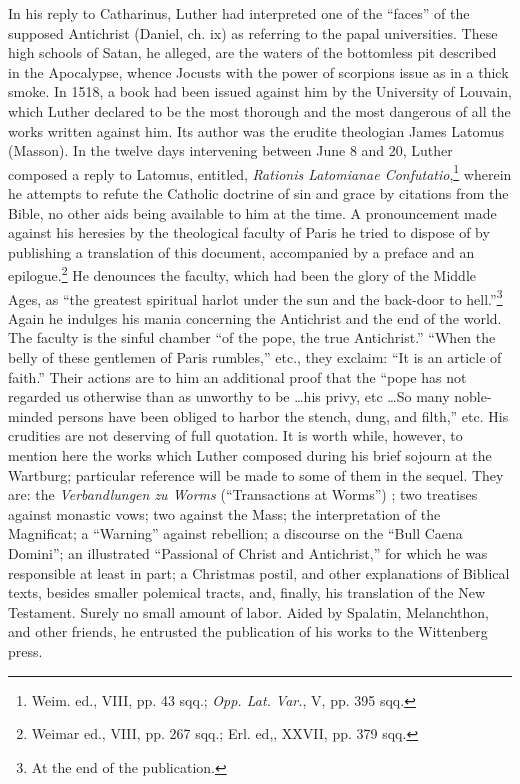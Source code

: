 In his reply to Catharinus, Luther had interpreted one of the
“faces” of the supposed Antichrist (Daniel, ch. ix) as referring to
the papal universities. These high schools of Satan, he alleged, are
the waters of the bottomless pit described in the Apocalypse, whence
Jocusts with the power of scorpions issue as in a thick smoke. In
1518, a book had been issued against him by the University of
Louvain, which Luther declared to be the most thorough and the most
dangerous of all the works written against him. Its author was the
erudite theologian James Latomus (Masson). In the twelve days
intervening between June 8 and 20, Luther composed a reply to
Latomus, entitled, \textit{Rationis Latomianae Confutatio},\footnote{Weim. ed., VIII, pp. 43 sqq.; \textit{Opp. Lat. Var.}, V, pp. 395 sqq.}
wherein he attempts to refute the Catholic doctrine of sin and grace by
citations from the Bible, no other aids being available to him at the time.
A pronouncement made against his heresies by the theological faculty
of Paris he tried to dispose of by publishing a translation of this
document, accompanied by a preface and an epilogue.\footnote{Weimar ed., VIII, pp. 267 sqq.; Erl. ed,, XXVII, pp. 379 sqq.}
He denounces
the faculty, which had been the glory of the Middle Ages, as “the
greatest spiritual harlot under the sun and the back-door to hell.”\footnote{At the end of the publication.}
Again he indulges his mania concerning the Antichrist and the end
of the world. The faculty is the sinful chamber “of the pope, the
true Antichrist.” “When the belly of these gentlemen of Paris
rumbles,” etc., they exclaim: “It is an article of faith.” Their actions
are to him an additional proof that the “pope has not regarded us
otherwise than as unworthy to be \dots his privy, etc \dots So many
noble-minded persons have been obliged to harbor the stench, dung,
and filth,” etc. His crudities are not deserving of full quotation.
It is worth while, however, to mention here the works which
Luther composed during his brief sojourn at the Wartburg; particular
reference will be made to some of them in the sequel. They are: the
\textit{Verbandlungen zu Worms} (“Transactions at Worms”) ; two treatises
against monastic vows; two against the Mass; the interpretation of
the Magnificat; a “Warning” against rebellion; a discourse on the
“Bull Caena Domini”; an illustrated “Passional of Christ and Antichrist,”
for which he was responsible at least in part; a Christmas
postil, and other explanations of Biblical texts, besides smaller polemical
tracts, and, finally, his translation of the New Testament. Surely
no small amount of labor. Aided by Spalatin, Melanchthon, and other
friends, he entrusted the publication of his works to the Wittenberg
press.

